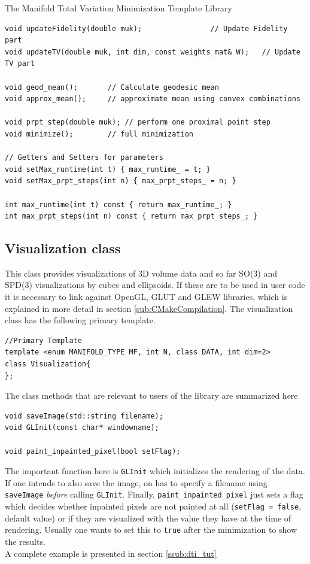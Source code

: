 \begin{chapter}{The Manifold Total Variation Minimization Template Library}
\begin{lstlisting}
void updateFidelity(double muk);			    // Update Fidelity part
void updateTV(double muk, int dim, const weights_mat& W);   // Update TV part

void geod_mean();	    // Calculate geodesic mean
void approx_mean();	    // approximate mean using convex combinations

void prpt_step(double muk); // perform one proximal point step
void minimize();	    // full minimization

// Getters and Setters for parameters
void setMax_runtime(int t) { max_runtime_ = t; }
void setMax_prpt_steps(int n) { max_prpt_steps_ = n; }
	    
int max_runtime(int t) const { return max_runtime_; }
int max_prpt_steps(int n) const { return max_prpt_steps_; }
\end{lstlisting}



\subsection{Visualization class} %
\label{sub:Visualization class}
This class provides visualizations of 3D volume data and so far SO(3) and SPD(3) visualizations by cubes and ellipsoids. If these are to be used in user code it is necessary to link
against OpenGL, GLUT and GLEW libraries, which is explained in more detail in section \ref{sub:CMakeCompilation}. The visualization class has the following primary template.
\cppinline
\begin{lstlisting}
//Primary Template
template <enum MANIFOLD_TYPE MF, int N, class DATA, int dim=2>
class Visualization{
};
\end{lstlisting}

The class methods that are relevant to users of the library are summarized here\\
\cppinline
\begin{lstlisting}
void saveImage(std::string filename);
void GLInit(const char* windowname);

void paint_inpainted_pixel(bool setFlag);
\end{lstlisting}

The important function here is \texttt{GLInit} which initializes the rendering of the data. If one intends to also save the image, on has to specify a filename using
\texttt{saveImage} \textit{before} calling \texttt{GLInit}. Finally, \texttt{paint\_inpainted\_pixel} just sets a flag which decides whether inpainted pixels are not painted
at all (\texttt{setFlag = false}, default value) or if they are visualized with the value they have at the time of rendering. Usually one wants to set this to \texttt{true}
after the minimization to show the results.\\
A complete example is presented in section \ref{ssub:dti_tut}\\


\end{chapter}
